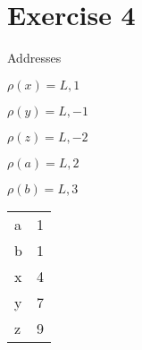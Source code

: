 \documentclass[10pt,a4paper]{article}
\begin{document}
	\section{Exercise 4}
	
	Addresses
	
	$\rho(x) = L, 1$
	
	$\rho(y) = L, -1$
	
	$\rho(z) = L, -2$
	
	$\rho(a) = L, 2$
	
	$\rho(b) = L, 3$
	
	\begin{tabular} {l | l}
		a & 1 \\
		b & 1 \\ 
		x & 4 \\
		y & 7 \\
		z & 9
	\end{tabular}
	
	
\end{document}
